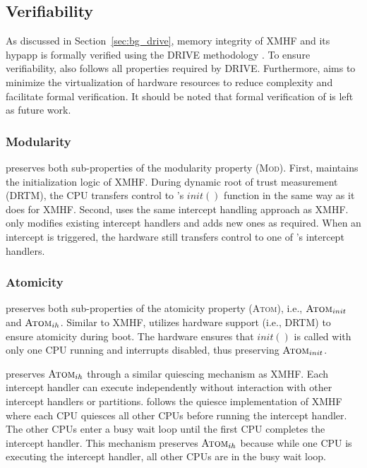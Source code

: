 \subsection{Verifiability}
\label{sec:design_verifiability}

As discussed in Section~\ref{sec:bg_drive}, memory integrity of XMHF and its hypapp is formally verified using the \textsc{DRIVE} methodology \cite{vasudevan2013design}. To ensure verifiability,  also follows all properties required by \textsc{DRIVE}. Furthermore,  aims to minimize the virtualization of hardware resources to reduce complexity and facilitate formal verification. It should be noted that formal verification of  is left as future work.

\subsubsection{Modularity}

 preserves both sub-properties of the modularity property (\textsc{Mod}). First,  maintains the initialization logic of XMHF. During dynamic root of trust measurement (DRTM), the CPU transfers control to 's $init()$ function in the same way as it does for XMHF. Second,  uses the same intercept handling approach as XMHF.  only modifies existing intercept handlers and adds new ones as required. When an intercept is triggered, the hardware still transfers control to one of 's intercept handlers.

\subsubsection{Atomicity}

 preserves both sub-properties of the atomicity property (\textsc{Atom}), i.e., $\text{\textsc{Atom}}_{init}$ and $\text{\textsc{Atom}}_{ih}$. Similar to XMHF,  utilizes hardware support (i.e., DRTM) to ensure atomicity during boot. The hardware ensures that $init()$ is called with only one CPU running and interrupts disabled, thus preserving $\text{\textsc{Atom}}_{init}$.

 preserves $\text{\textsc{Atom}}_{ih}$ through a similar quiescing mechanism as XMHF. Each intercept handler can execute independently without interaction with other intercept handlers or partitions.
 follows the quiesce implementation of XMHF where each CPU quiesces all other CPUs before running the intercept handler. The other CPUs enter a busy wait loop until the first CPU completes the intercept handler. This mechanism preserves $\text{\textsc{Atom}}_{ih}$ because while one CPU is executing the intercept handler, all other CPUs are in the busy wait loop.

